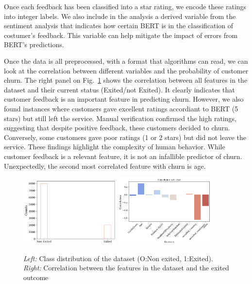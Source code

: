 \documentclass[12pt]{article}
\begin{document}
Once each feedback has been classified into a star rating, we encode these ratings into integer labels. We also include in the analysis a derived variable from the sentiment analysis that indicates how certain \textsc{BERT} is in the classification of costumer's feedback. This variable can help mitigate the impact of errors from \textsc{BERT}'s predictions.

Once the data is all preprocessed, with a format that algorithms can read, we can look at the correlation between different variables and the probability of customer churn. The right panel on Fig.~\ref{fig:class_distribution} shows the correlation between all features in the dataset and their current status (Exited/not Exited). It clearly indicates that customer feedback is an important feature in predicting churn. However, we also found instances where customers gave excellent ratings accordiant to \textsc{BERT} (5 stars) but still left the service. Manual verification confirmed the high ratings, suggesting that despite positive feedback, these customers decided to churn. Conversely, some customers gave poor ratings (1 or 2 stars) but did not leave the service. These findings highlight the complexity of human behavior. While customer feedback is a relevant feature, it is not an infallible predictor of churn. Unexpectedly, the second most correlated feature with churn is age. 

\begin{figure}[h!]
    \centering
    \includegraphics[width=0.45\textwidth]{figures/class_distribution.png}
    \includegraphics[width=0.45\textwidth]{figures/correlation_matrix.png}
    \caption{\emph{Left:} Class distribution of the dataset (O:Non exited, 1:Exited). \emph{Right:} Correlation between the features in the dataset and the exited outcome}
    \label{fig:class_distribution}
\end{figure}
\end{document}

